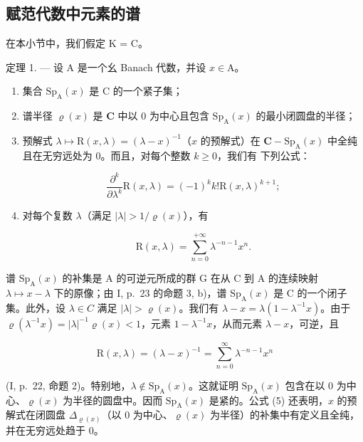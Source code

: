 \subsection{赋范代数中元素的谱}

在本小节中，我们假定 K = C。

定理 1. --- 设 A 是一个幺 Banach 代数，并设 \(x \in \mathrm{A}\)。

\begin{enumerate}
\def\labelenumi{\alph{enumi})}
\item
  集合 \(\mathrm{Sp}_{\mathrm{A}}(x)\) 是 C 的一个紧子集；
\item
  谱半径 \(\varrho(x)\) 是 \(\mathbf{C}\) 中以 0 为中心且包含 \(\mathrm{Sp}_{\mathrm{A}}(x)\) 的最小闭圆盘的半径；
\item
  预解式 \(\lambda \mapsto \mathrm{R}(x,\lambda) = (\lambda -x)^{-1}\)（\(x\) 的预解式）在 \(\mathbf{C} - \mathrm{Sp}_{\mathrm{A}}(x)\) 中全纯且在无穷远处为 0。而且，对每个整数 \(k\geqslant 0\)，我们有
下列公式：

\[
\frac {\partial^ {k}}{\partial \lambda^ {k}} \mathrm{R} (x, \lambda) = (- 1) ^ {k} k! \mathrm{R} (x, \lambda) ^ {k + 1};
\]

\item
  对每个复数 \(\lambda\)（满足 \(|\lambda| > 1 / \varrho(x)\)），有

\[
\mathrm{R} (x, \lambda) = \sum_ {n = 0} ^ {+ \infty} \lambda^ {- n - 1} x ^ {n}.
\]

\end{enumerate}

谱 \(\mathrm{Sp}_{\mathrm{A}}(x)\) 的补集是 A 的可逆元所成的群 G 在从 C 到 A 的连续映射 \(\lambda \mapsto x - \lambda\) 下的原像；由 I, p.~23 的命题 3, b)，谱 \(\mathrm{Sp}_{\mathrm{A}}(x)\) 是 C 的一个闭子集。此外，设 \(\lambda \in C\) 满足 \(|\lambda| > \varrho(x)\)。我们有 \(\lambda - x = \lambda(1 - \lambda^{-1}x)\)。由于 \(\varrho(\lambda^{-1}x) = |\lambda|^{-1}\varrho(x) < 1\)，元素 \(1 - \lambda^{-1}x\)，从而元素 \(\lambda - x\)，可逆，且

\[
\mathrm{R} (x, \lambda) = (\lambda - x) ^ {- 1} = \sum_ {n = 0} ^ {\infty} \lambda^ {- n - 1} x ^ {n}\tag{5}
\]

(I, p.~22, 命题 2)。特别地，\(\lambda \notin \mathrm{Sp}_{\mathrm{A}}(x)\)。这就证明 \(\mathrm{Sp}_{\mathrm{A}}(x)\) 包含在以 0 为中心、\(\varrho(x)\) 为半径的圆盘中。因而 \(\mathrm{Sp}_{\mathrm{A}}(x)\) 是紧的。公式 (5) 还表明，\(x\) 的预解式在闭圆盘 \(\Delta_{\varrho(x)}\)（以 0 为中心、\(\varrho(x)\) 为半径）的补集中有定义且全纯，并在无穷远处趋于 0。

